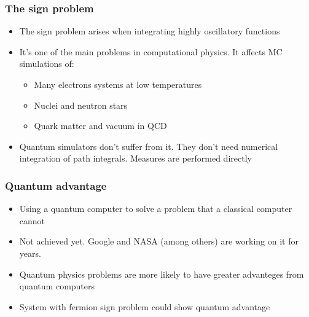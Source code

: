 \documentclass[10pt,t,xcolor=dvipsnames,aspectratio=169]{beamer}
\begin{document}
\begin{frame}
    \frametitle{The sign problem}
    \begin{itemize}
        \item
            The sign problem arises when integrating highly oscillatory functions
        \item
            It's one of the main problems in computational physics.
            It affects MC simulations of:
            \begin{itemize}
                \item Many electrons systems at low temperatures
                \item Nuclei and neutron stars
                \item Quark matter and vacuum in QCD
            \end{itemize}
        \item
            Quantum simulators don't suffer from it.
            They don't need numerical integration of path integrals.
            Measures are performed directly
    \end{itemize}
\end{frame}

\begin{frame}
    \frametitle{Quantum advantage}
    \begin{itemize}
        \item
            Using a quantum computer to solve a problem that a classical computer cannot
        \item
            Not achieved yet. Google and NASA (among others) are working on it for years.
        \item
            Quantum physics problems are more likely to have greater advanteges from quantum computers
        \item
            System with fermion sign problem could show quantum advantage
    \end{itemize}
\end{frame}
\end{document}
